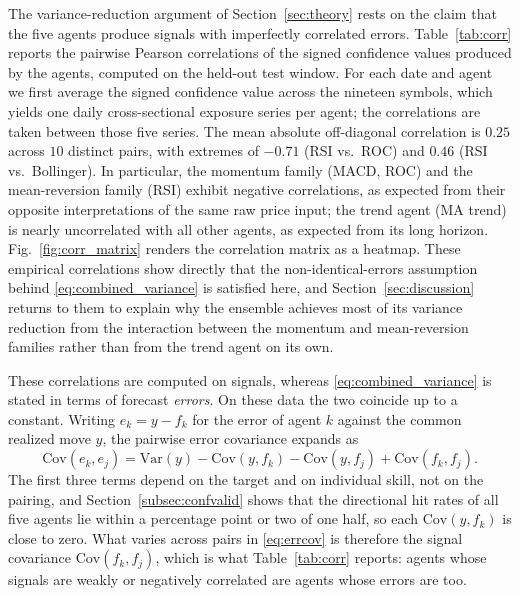 \documentclass{ieeeaccess}
\newcommand{\CorrMeanAbs}{\ensuremath{0.25}}
\newcommand{\CorrMin}{\ensuremath{-0.71}}
\newcommand{\CorrMax}{\ensuremath{0.46}}
\newcommand{\CorrN}{\ensuremath{10}}
\begin{document}
The variance-reduction argument of Section~\ref{sec:theory} rests on the claim that the five agents produce signals with imperfectly correlated errors. Table~\ref{tab:corr} reports the pairwise Pearson correlations \cite{pearson1896} of the signed confidence values produced by the agents, computed on the held-out test window. For each date and agent we first average the signed confidence value across the nineteen symbols, which yields one daily cross-sectional exposure series per agent; the correlations are taken between those five series. The mean absolute off-diagonal correlation is \CorrMeanAbs{} across \CorrN{} distinct pairs, with extremes of \CorrMin{} (RSI vs.\ ROC) and \CorrMax{} (RSI vs.\ Bollinger). In particular, the momentum family (MACD, ROC) and the mean-reversion family (RSI) exhibit negative correlations, as expected from their opposite interpretations of the same raw price input; the trend agent (MA trend) is nearly uncorrelated with all other agents, as expected from its long horizon. Fig.~\ref{fig:corr_matrix} renders the correlation matrix as a heatmap. These empirical correlations show directly that the non-identical-errors assumption behind \eqref{eq:combined_variance} is satisfied here, and Section~\ref{sec:discussion} returns to them to explain why the ensemble achieves most of its variance reduction from the interaction between the momentum and mean-reversion families rather than from the trend agent on its own.

These correlations are computed on signals, whereas \eqref{eq:combined_variance} is stated in terms of forecast \emph{errors}. On these data the two coincide up to a constant. Writing $e_k = y - f_k$ for the error of agent $k$ against the common realized move $y$, the pairwise error covariance expands as
\begin{equation}
\mathrm{Cov}(e_k, e_j) = \mathrm{Var}(y) - \mathrm{Cov}(y, f_k) - \mathrm{Cov}(y, f_j) + \mathrm{Cov}(f_k, f_j).
\label{eq:errcov}
\end{equation}
The first three terms depend on the target and on individual skill, not on the pairing, and Section~\ref{subsec:confvalid} shows that the directional hit rates of all five agents lie within a percentage point or two of one half, so each $\mathrm{Cov}(y, f_k)$ is close to zero. What varies across pairs in \eqref{eq:errcov} is therefore the signal covariance $\mathrm{Cov}(f_k, f_j)$, which is what Table~\ref{tab:corr} reports: agents whose signals are weakly or negatively correlated are agents whose errors are too.
\end{document}

